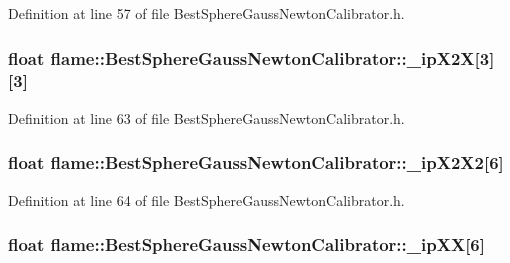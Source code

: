 Definition at line 57 of file Best\-Sphere\-Gauss\-Newton\-Calibrator.\-h.

\hypertarget{classflame_1_1_best_sphere_gauss_newton_calibrator_a4fe0ab3079eba8062e36b8ecf7894632}{
\subsubsection[{\-\_\-ip\-X2\-X}]{\setlength{\rightskip}{0pt plus 5cm}float flame\-::\-Best\-Sphere\-Gauss\-Newton\-Calibrator\-::\-\_\-ip\-X2\-X\mbox{[}3\mbox{]}\mbox{[}3\mbox{]}\hspace{0.3cm}{\ttfamily [protected]}}}\label{classflame_1_1_best_sphere_gauss_newton_calibrator_a4fe0ab3079eba8062e36b8ecf7894632}


Definition at line 63 of file Best\-Sphere\-Gauss\-Newton\-Calibrator.\-h.

\hypertarget{classflame_1_1_best_sphere_gauss_newton_calibrator_a32f84ef767c6186082fff10955775e11}{
\subsubsection[{\-\_\-ip\-X2\-X2}]{\setlength{\rightskip}{0pt plus 5cm}float flame\-::\-Best\-Sphere\-Gauss\-Newton\-Calibrator\-::\-\_\-ip\-X2\-X2\mbox{[}6\mbox{]}\hspace{0.3cm}{\ttfamily [protected]}}}\label{classflame_1_1_best_sphere_gauss_newton_calibrator_a32f84ef767c6186082fff10955775e11}


Definition at line 64 of file Best\-Sphere\-Gauss\-Newton\-Calibrator.\-h.

\hypertarget{classflame_1_1_best_sphere_gauss_newton_calibrator_a37f752e75712c8526e49192e1db0dc4a}{
\subsubsection[{\-\_\-ip\-X\-X}]{\setlength{\rightskip}{0pt plus 5cm}float flame\-::\-Best\-Sphere\-Gauss\-Newton\-Calibrator\-::\-\_\-ip\-X\-X\mbox{[}6\mbox{]}\hspace{0.3cm}{\ttfamily [protected]}}}\label{classflame_1_1_best_sphere_gauss_newton_calibrator_a37f752e75712c8526e49192e1db0dc4a}


